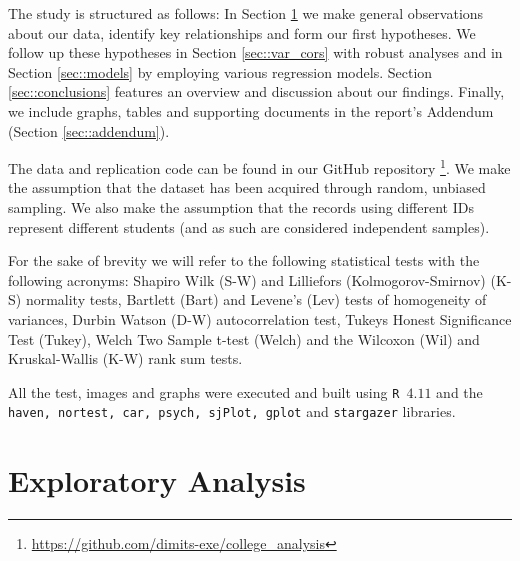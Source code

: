 \documentclass[10pt, a4paper]{article}
\def\code#1{\texttt{#1}}
\begin{document}
	The study is structured as follows: In Section \ref{sec::exploratory} we make general observations about our data, identify key relationships and form our first hypotheses. We follow up these hypotheses in Section \ref{sec::var_cors} with robust analyses and in Section \ref{sec::models} by employing various regression models. Section \ref{sec::conclusions} features an overview and discussion about our findings. Finally, we include graphs, tables and supporting documents in the report's Addendum (Section \ref{sec::addendum}).
	
	The data and replication code can be found in our GitHub repository \footnote{\url{https://github.com/dimits-exe/college_analysis}}. We make the assumption that the dataset has been acquired through random, unbiased sampling. We also make the assumption that the records using different IDs represent different students (and as such are considered independent samples).
	
	For the sake of brevity we will refer to the following statistical tests with the following acronyms: Shapiro Wilk (S-W) and Lilliefors (Kolmogorov-Smirnov) (K-S) normality tests, Bartlett (Bart) and Levene's (Lev) tests of homogeneity of variances, Durbin Watson (D-W) autocorrelation test, Tukeys Honest Significance Test (Tukey), Welch Two Sample t-test (Welch) and the Wilcoxon (Wil) and Kruskal-Wallis (K-W) rank sum tests.
	
	All the test, images and graphs were executed and built using \code{R $4.11$} and the \code{haven, nortest, car, psych, sjPlot, gplot} and \code{stargazer} libraries.
	
	\section{Exploratory Analysis}
	\label{sec::exploratory}
	
\end{document}
